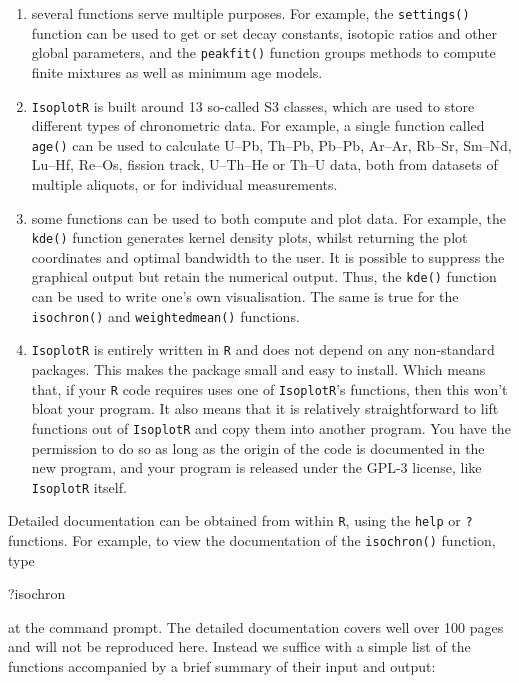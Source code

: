 \begin{refsection}
\begin{enumerate}
\item several functions serve multiple purposes. For example, the
  \texttt{settings()} function can be used to get or set decay
  constants, isotopic ratios and other global parameters, and the
  \texttt{peakfit()} function groups methods to compute finite
  mixtures as well as minimum age models.
\item \texttt{IsoplotR} is built around 13 so-called S3 classes,
  which are used to store different types of chronometric data. For
  example, a single function called \texttt{age()} can be used to
  calculate U--Pb, Th--Pb, Pb--Pb, Ar--Ar, Rb--Sr, Sm--Nd, Lu--Hf,
  Re--Os, fission track, U--Th--He or Th--U data, both from datasets
  of multiple aliquots, or for individual measurements.
\item some functions can be used to both compute and plot data.  For
  example, the \texttt{kde()} function generates kernel density plots,
  whilst returning the plot coordinates and optimal bandwidth to the
  user. It is possible to suppress the graphical output but retain the
  numerical output. Thus, the \texttt{kde()} function can be used to
  write one's own visualisation. The same is true for the
  \texttt{isochron()} and \texttt{weightedmean()} functions.
\item \texttt{IsoplotR} is entirely written in \texttt{R} and does not
  depend on any non-standard packages. This makes the package small
  and easy to install. Which means that, if your \texttt{R} code
  requires uses one of \texttt{IsoplotR}'s functions, then this won't
  bloat your program. It also means that it is relatively
  straightforward to lift functions out of \texttt{IsoplotR} and copy
  them into another program. You have the permission to do so as long
  as the origin of the code is documented in the new program, and your
  program is released under the GPL-3 license, like \texttt{IsoplotR}
  itself.
\end{enumerate}

Detailed documentation can be obtained from within \texttt{R}, using
the \texttt{help} or \texttt{?} functions. For example, to view
the documentation of the \texttt{isochron()} function, type

\begin{console}
?isochron
\end{console}

\noindent at the command prompt. The detailed documentation covers
well over 100 pages and will not be reproduced here. Instead we
suffice with a simple list of the functions accompanied by a brief
summary of their input and output:


\end{refsection}
